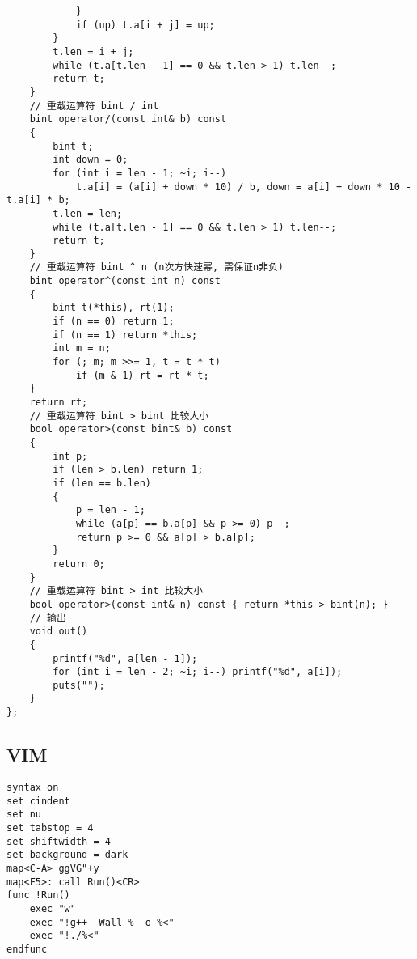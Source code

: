 \documentclass[twoside]{article}
\begin{document}
\begin{lstlisting}
            }
            if (up) t.a[i + j] = up;
        }
        t.len = i + j;
        while (t.a[t.len - 1] == 0 && t.len > 1) t.len--;
        return t;
    }
    // 重载运算符 bint / int
    bint operator/(const int& b) const
    {
        bint t;
        int down = 0;
        for (int i = len - 1; ~i; i--)
            t.a[i] = (a[i] + down * 10) / b, down = a[i] + down * 10 - t.a[i] * b;
        t.len = len;
        while (t.a[t.len - 1] == 0 && t.len > 1) t.len--;
        return t;
    }
    // 重载运算符 bint ^ n (n次方快速幂, 需保证n非负)
    bint operator^(const int n) const
    {
        bint t(*this), rt(1);
        if (n == 0) return 1;
        if (n == 1) return *this;
        int m = n;
        for (; m; m >>= 1, t = t * t)
            if (m & 1) rt = rt * t;
    }
    return rt;
    // 重载运算符 bint > bint 比较大小
    bool operator>(const bint& b) const
    {
        int p;
        if (len > b.len) return 1;
        if (len == b.len)
        {
            p = len - 1;
            while (a[p] == b.a[p] && p >= 0) p--;
            return p >= 0 && a[p] > b.a[p];
        }
        return 0;
    }
    // 重载运算符 bint > int 比较大小
    bool operator>(const int& n) const { return *this > bint(n); }
    // 输出
    void out()
    {
        printf("%d", a[len - 1]);
        for (int i = len - 2; ~i; i--) printf("%d", a[i]);
        puts("");
    }
};
\end{lstlisting}
\subsection{VIM}
\begin{lstlisting}
syntax on
set cindent
set nu
set tabstop = 4
set shiftwidth = 4
set background = dark
map<C-A> ggVG"+y
map<F5>: call Run()<CR>
func !Run()
    exec "w"
    exec "!g++ -Wall % -o %<"
    exec "!./%<"
endfunc
\end{lstlisting}
\end{document}
